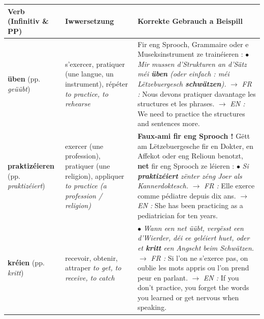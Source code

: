\begin{table}[htbp]
    \centering
    \begin{tabular}{p{3.2cm}p{3.0cm}p{9.0cm}}
        \toprule
        \textbf{Verb (Infinitiv \& PP)} & \textbf{Iwwersetzung} & \textbf{Korrekte Gebrauch a Beispill} \\
        \midrule
        \textbf{üben} \newline (pp. \textit{geüübt}) & s'exercer, pratiquer (une langue, un instrument), répéter \newline \textit{to practice, to rehearse} & Fir eng Sprooch, Grammaire oder e Museksinstrument ze trainéieren : \newline $\bullet$ \textit{Mir mussen d'Strukturen an d'Sätz méi \textbf{üben} (oder einfach : méi Lëtzebuergesch \textbf{schwätzen}).} \newline $\rightarrow$ \textit{FR :} Nous devons pratiquer davantage les structures et les phrases. \newline $\rightarrow$ \textit{EN :} We need to practice the structures and sentences more. \\
        \midrule
        \textbf{praktizéieren} \newline (pp. \textit{praktizéiert}) & exercer (une profession), pratiquer (une religion), appliquer \newline \textit{to practice (a profession / religion)} & \textbf{Faux-ami fir eng Sprooch !} Gëtt am Lëtzebuergesche fir en Dokter, en Affekot oder eng Relioun benotzt, \textbf{net} fir eng Sprooch ze léieren : \newline $\bullet$ \textit{Si \textbf{praktizéiert} zënter zéng Joer als Kannerdoktesch.} \newline $\rightarrow$ \textit{FR :} Elle exerce comme pédiatre depuis dix ans. \newline $\rightarrow$ \textit{EN :} She has been practicing as a pediatrician for ten years. \\
        \midrule
        \textbf{kréien} \newline (pp. \textit{kritt}) & recevoir, obtenir, attraper \newline \textit{to get, to receive, to catch} & $\bullet$ \textit{Wann een net üübt, vergësst een d'Wierder, déi ee geléiert huet, oder et \textbf{kritt} een Angscht beim Schwätzen.} \newline $\rightarrow$ \textit{FR :} Si l'on ne s'exerce pas, on oublie les mots appris ou l'on prend peur en parlant. \newline $\rightarrow$ \textit{EN :} If you don't practice, you forget the words you learned or get nervous when speaking. \\

\end{tabular}
\end{table}
